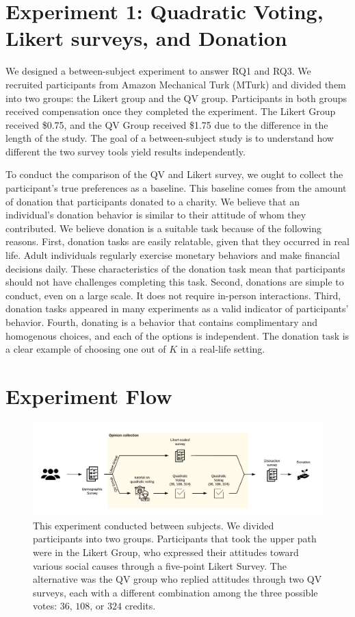 \section{Experiment 1: Quadratic Voting, Likert surveys, and Donation}
We designed a between-subject experiment to answer RQ1 and RQ3. We recruited participants from Amazon Mechanical Turk (MTurk) and divided them into two groups: the Likert group and the QV group. Participants in both groups received compensation once they completed the experiment. The Likert Group received \$0.75, and the QV Group received \$1.75 due to the difference in the length of the study. The goal of a between-subject study is to understand how different the two survey tools yield results independently.

To conduct the comparison of the QV and Likert survey, we ought to collect the participant's true preferences as a baseline. This baseline comes from the amount of donation that participants donated to a charity. We believe that an individual's donation behavior is similar to their attitude of whom they contributed. We believe donation is a suitable task because of the following reasons. First, donation tasks are easily relatable, given that they occurred in real life. Adult individuals regularly exercise monetary behaviors and make financial decisions daily. These characteristics of the donation task mean that participants should not have challenges completing this task. Second, donations are simple to conduct, even on a large scale. It does not require in-person interactions. Third, donation tasks appeared in many experiments \cite{Xiao2019, benz2008people, gendall2010effect} as a valid indicator of participants' behavior. Fourth, donating is a behavior that contains complimentary and homogenous choices, and each of the options is independent. The donation task is a clear example of choosing one out of $K$ in a real-life setting.

\section{Experiment Flow}
\begin{figure}[htpb]
    \centering
    \includegraphics[width=\textwidth, keepaspectratio=true]{content/image/exp1_flow.pdf}
    \caption{
        This experiment conducted between subjects. We divided participants into two groups. Participants that took the upper path were in the Likert Group, who expressed their attitudes toward various social causes through a five-point Likert Survey. The alternative was the QV group who replied attitudes through two QV surveys, each with a different combination among the three possible votes: $36$, $108$, or $324$ credits.
    }
    \label{fig:exp1_image_flow}
\end{figure}

